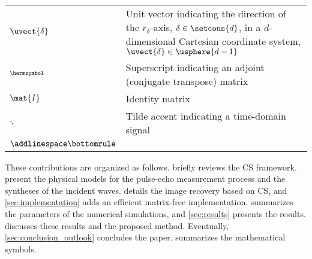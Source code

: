 \begin{table*}[tb]
\begin{tabular}{%
  @{}%
  >{$}l<{$}%
  p{}%
  @{}%
 }
  \uvect{\delta} &
  Unit vector indicating
  the direction of
  the $r_{\delta}$-axis, $\delta \in \setcons{ d }$, in
  a $d$-dimensional Cartesian coordinate system,
  $\uvect{\delta} \in \usphere{d-1}$\\
  ^{\hermsymbol} &
  Superscript indicating
  an adjoint (conjugate transpose) matrix\\
  \mat{I} &
  Identity matrix\\
  \tilde{ \cdot } &
  Tilde accent indicating
  a time-domain signal\\%
 \addlinespace
 \bottomrule
 \end{tabular}
\end{table*}

These contributions are organized as
follows.
 briefly reviews
the \ac{CS} framework.
 present
the physical models for
the pulse-echo measurement process and
the syntheses of
the incident waves.
 details
the image recovery based on
\ac{CS}, and
\cref{sec:implementation} adds
an efficient matrix-free implementation.
 summarizes
the parameters of
the numerical simulations, and
\cref{sec:results} presents
the results.
 discusses
these results and
the proposed method.
Eventually,
\cref{sec:conclusion_outlook} concludes
the paper.
 summarizes
the mathematical symbols.
